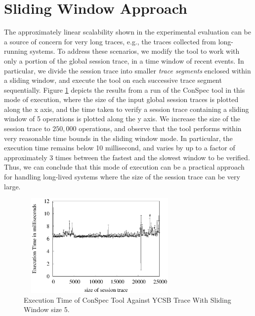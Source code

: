 \documentclass[journal, compsoc]{IEEEtran}
\begin{document}
	\section{Sliding Window Approach}\label{sec:additionalYCSBexp}
	The approximately linear scalability shown in the experimental evaluation can be a source of concern for very long traces, e.g., the traces collected from long-running systems. To address these scenarios, we modify the tool to work with only a portion of the global session trace, in a time window of recent events. In particular, we divide the session trace into smaller \emph{trace segments} enclosed within a sliding window, and execute  the tool on  each successive trace segment sequentially.   Figure \ref{fig:exampleIter} depicts the results from a run of the ConSpec tool in this mode of execution, where the size of the input global session traces is plotted along the x axis, and the time taken to verify a session trace containing a sliding window of 5 operations is plotted along the y axis. We increase the size of the session trace to $250,000$ operations, and observe that the tool performs within very reasonable time bounds in the sliding window mode. In particular, the execution time remains below %
	10 millisecond, and varies by up to a factor of approximately 3 times between the fastest and the slowest window to be verified.   Thus, we can conclude that this mode of execution can be a practical approach for handling long-lived systems where the size of the session trace can be very large.
	\begin{figure}%
		\includegraphics[width=3.2in,height=2in]
		{conspecExecutionTimes.eps} %
		\caption{Execution Time of ConSpec Tool Against YCSB Trace With Sliding Window size 5.}
		\label{fig:exampleIter}
	\end{figure}
\end{document}
